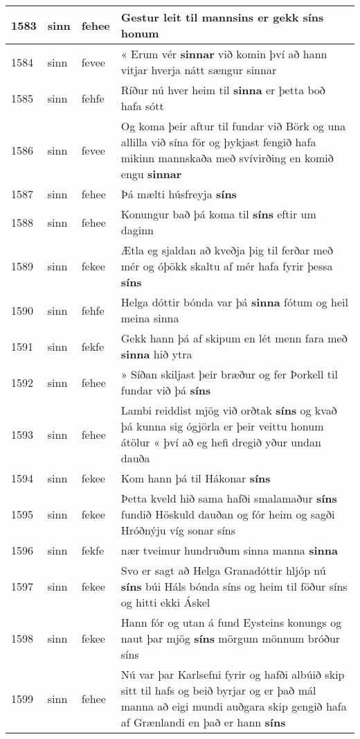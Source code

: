 \documentclass{article}
\begin{document}
\begin{longtable}{p{1cm}|p{1cm}|p{1cm}|p{13cm}}
\hline
1583&sinn&fehee&Gestur leit til mannsins er gekk \textbf{síns} honum\\
\hline
1584&sinn&fevee&« Erum vér \textbf{sinnar} við komin því að hann vitjar hverja nátt sængur sinnar\\
\hline
1585&sinn&fehfe&Ríður nú hver heim til \textbf{sinna} er þetta boð hafa sótt\\
\hline
1586&sinn&fevee&Og koma þeir aftur til fundar við Börk og una allilla við sína för og þykjast fengið hafa mikinn mannskaða með svívirðing en komið engu \textbf{sinnar} \\
\hline
1587&sinn&fehee&Þá mælti húsfreyja \textbf{síns} \\
\hline
1588&sinn&fehee&Konungur bað þá koma til \textbf{síns} eftir um daginn\\
\hline
1589&sinn&fekee&Ætla eg sjaldan að kveðja þig til ferðar með mér og óþökk skaltu af mér hafa fyrir þessa \textbf{síns} \\
\hline
1590&sinn&fehfe&Helga dóttir bónda var þá \textbf{sinna} fótum og heil meina sinna\\
\hline
1591&sinn&fekfe&Gekk hann þá af skipum en lét menn fara með \textbf{sinna} hið ytra\\
\hline
1592&sinn&fehee&» Síðan skiljast þeir bræður og fer Þorkell til fundar við þá \textbf{síns} \\
\hline
1593&sinn&fehee&Lambi reiddist mjög við orðtak \textbf{síns} og kvað þá kunna sig ógjörla er þeir veittu honum átölur « því að eg hefi dregið yður undan dauða\\
\hline
1594&sinn&fekee&Kom hann þá til Hákonar \textbf{síns} \\
\hline
1595&sinn&fekee&Þetta kveld hið sama hafði smalamaður \textbf{síns} fundið Höskuld dauðan og fór heim og sagði Hróðnýju víg sonar síns\\
\hline
1596&sinn&fekfe&nær tveimur hundruðum sinna manna \textbf{sinna} \\
\hline
1597&sinn&fekee&Svo er sagt að Helga Granadóttir hljóp nú \textbf{síns} búi Háls bónda síns og heim til föður síns og hitti ekki Áskel\\
\hline
1598&sinn&fekee&Hann fór og utan á fund Eysteins konungs og naut þar mjög \textbf{síns} mörgum mönnum bróður síns\\
\hline
1599&sinn&fehee&Nú var þar Karlsefni fyrir og hafði albúið skip sitt til hafs og beið byrjar og er það mál manna að eigi mundi auðgara skip gengið hafa af Grænlandi en það er hann \textbf{síns} \\

\end{longtable}
\end{document}
